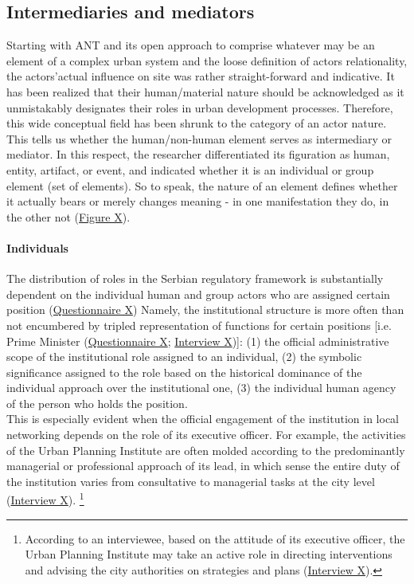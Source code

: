 \documentclass[11pt]{report}
\begin{document}
{{{{\subsection{Intermediaries and mediators}

Starting with ANT and its open approach to comprise whatever may be an element of a complex urban system and the loose definition of actors relationality, the actors’actual influence on site was rather straight-forward and indicative. It has been realized that their human/material nature should be acknowledged as it unmistakably designates their roles in urban development processes. Therefore, this wide conceptual field has been shrunk to the category of an actor nature. This tells us whether the human/non-human element serves as intermediary or mediator. In this respect, the researcher differentiated its figuration as human, entity, artifact, or event, and indicated whether it is an individual or group element (set of elements). So to speak, the nature of an element defines whether it actually bears or merely changes meaning - in one manifestation they do, in the other not (\href{Figure 5 ANT paper}{Figure X}).

\paragraph{Individuals}
The distribution of roles in the Serbian regulatory framework is substantially dependent on the individual human and group actors who are assigned certain position (\href{Questionnaire Experts Post-socialist}{Questionnaire X})
Namely, the institutional structure is more often than not encumbered by tripled representation of functions for certain positions [i.e. Prime Minister (\href{Questionnaire Experts Post-socialist}{Questionnaire X}; \href{Interview}{Interview X})]:
(1) the official administrative scope of the institutional role assigned to an individual,
(2) the symbolic significance assigned to the role based on the historical dominance of the individual approach over the institutional one,
(3) the individual human agency of the person who holds the position.
\\

This is especially evident when the official engagement of the institution in local networking depends on the role of its executive officer. For example, the activities of the Urban Planning Institute are often molded according to the predominantly managerial or professional approach of its lead, in which sense the entire duty of the institution varies from consultative to managerial tasks at the city level (\href{Annex}{Interview X}).
\footnote{
According to an interviewee, based on the attitude of its executive officer, the Urban Planning Institute may take an active role in directing interventions and advising the city authorities on strategies and plans (\href{InterviewX}{Interview X}).}
\\

}}}}
\end{document}
